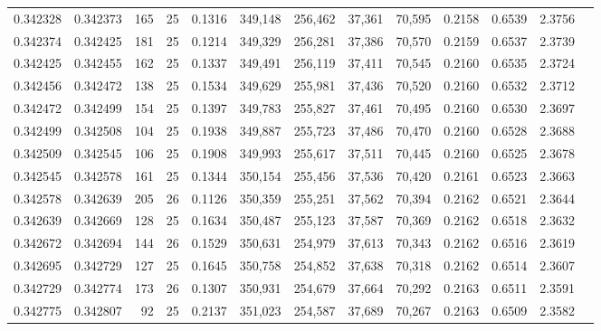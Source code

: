 \begin{tabular}{rrrrrrrrrrrrr}
0.342328 & 0.342373 &   165 &  25 &                                     0.1316 & 349,148 & 256,462 &  37,361 &  70,595 & 0.2158 & 0.6539 & 2.3756 \\
0.342374 & 0.342425 &   181 &  25 &                                     0.1214 & 349,329 & 256,281 &  37,386 &  70,570 & 0.2159 & 0.6537 & 2.3739 \\
0.342425 & 0.342455 &   162 &  25 &                                     0.1337 & 349,491 & 256,119 &  37,411 &  70,545 & 0.2160 & 0.6535 & 2.3724 \\
0.342456 & 0.342472 &   138 &  25 &                                     0.1534 & 349,629 & 255,981 &  37,436 &  70,520 & 0.2160 & 0.6532 & 2.3712 \\
0.342472 & 0.342499 &   154 &  25 &                                     0.1397 & 349,783 & 255,827 &  37,461 &  70,495 & 0.2160 & 0.6530 & 2.3697 \\
0.342499 & 0.342508 &   104 &  25 &                                     0.1938 & 349,887 & 255,723 &  37,486 &  70,470 & 0.2160 & 0.6528 & 2.3688 \\
0.342509 & 0.342545 &   106 &  25 &                                     0.1908 & 349,993 & 255,617 &  37,511 &  70,445 & 0.2160 & 0.6525 & 2.3678 \\
0.342545 & 0.342578 &   161 &  25 &                                     0.1344 & 350,154 & 255,456 &  37,536 &  70,420 & 0.2161 & 0.6523 & 2.3663 \\
0.342578 & 0.342639 &   205 &  26 &                                     0.1126 & 350,359 & 255,251 &  37,562 &  70,394 & 0.2162 & 0.6521 & 2.3644 \\
0.342639 & 0.342669 &   128 &  25 &                                     0.1634 & 350,487 & 255,123 &  37,587 &  70,369 & 0.2162 & 0.6518 & 2.3632 \\
0.342672 & 0.342694 &   144 &  26 &                                     0.1529 & 350,631 & 254,979 &  37,613 &  70,343 & 0.2162 & 0.6516 & 2.3619 \\
0.342695 & 0.342729 &   127 &  25 &                                     0.1645 & 350,758 & 254,852 &  37,638 &  70,318 & 0.2162 & 0.6514 & 2.3607 \\
0.342729 & 0.342774 &   173 &  26 &                                     0.1307 & 350,931 & 254,679 &  37,664 &  70,292 & 0.2163 & 0.6511 & 2.3591 \\
0.342775 & 0.342807 &    92 &  25 &                                     0.2137 & 351,023 & 254,587 &  37,689 &  70,267 & 0.2163 & 0.6509 & 2.3582 \\

\end{tabular}
